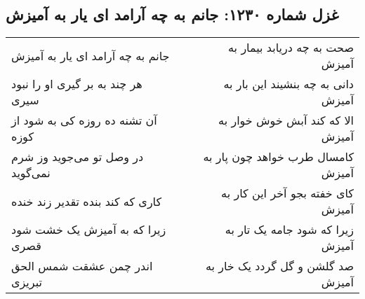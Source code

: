 \begin{center}
\section*{غزل شماره ۱۲۳۰: جانم به چه آرامد ای یار به آمیزش}
\label{sec:1230}
\begin{longtable}{l p{0.5cm} r}
جانم به چه آرامد ای یار به آمیزش
&&
صحت به چه دریابد بیمار به آمیزش
\\
هر چند به بر گیری او را نبود سیری
&&
دانی به چه بنشیند این بار به آمیزش
\\
آن تشنه ده روزه کی به شود از کوزه
&&
الا که کند آبش خوش خوار به آمیزش
\\
در وصل تو می‌جوید وز شرم نمی‌گوید
&&
کامسال طرب خواهد چون پار به آمیزش
\\
کاری که کند بنده تقدیر زند خنده
&&
کای خفته بجو آخر این کار به آمیزش
\\
زیرا که به آمیزش یک خشت شود قصری
&&
زیرا که شود جامه یک تار به آمیزش
\\
اندر چمن عشقت شمس الحق تبریزی
&&
صد گلشن و گل گردد یک خار به آمیزش
\\
\end{longtable}
\end{center}
